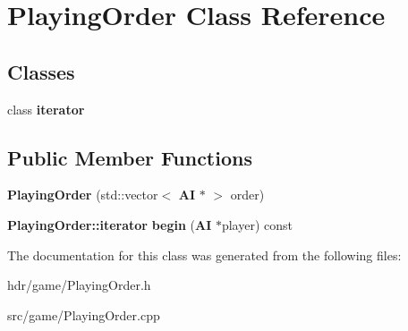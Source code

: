 \section{Playing\-Order Class Reference}
\label{class_playing_order}
\subsection*{Classes}
\begin{DoxyCompactItemize}
\item 
class {\bf iterator}
\end{DoxyCompactItemize}
\subsection*{Public Member Functions}
\begin{DoxyCompactItemize}
\item 
{\bfseries Playing\-Order} (std\-::vector$<$ {\bf A\-I} $\ast$ $>$ order)\label{class_playing_order_a7f530887195bc39170e48628fe33a2e8}

\item 
{\bf Playing\-Order\-::iterator} {\bfseries begin} ({\bf A\-I} $\ast$player) const \label{class_playing_order_ae84e1df8d1e7cbce8787895375a1a1f2}

\end{DoxyCompactItemize}


The documentation for this class was generated from the following files\-:\begin{DoxyCompactItemize}
\item 
hdr/game/Playing\-Order.\-h\item 
src/game/Playing\-Order.\-cpp\end{DoxyCompactItemize}

